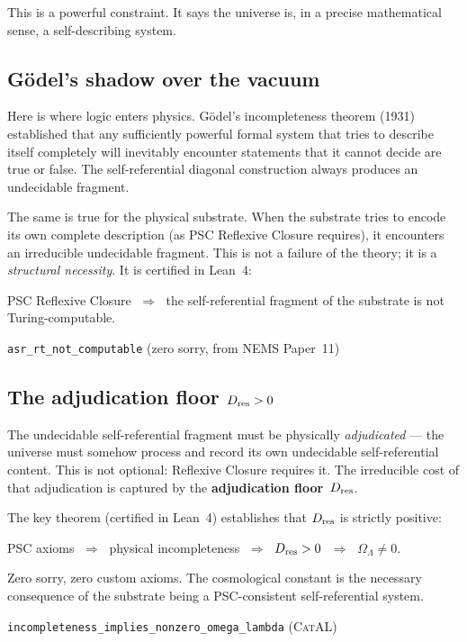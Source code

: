 \documentclass[11pt,a4paper]{article}
\newcommand{\term}[1]{\textbf{#1}}
\newcommand{\lean}[1]{\texttt{#1}}
\newcommand{\OmL}{\Omega_\Lambda}
\newcommand{\Dres}{D_{\rm res}}
\newcommand{\CatAL}{\textsc{CatAL}}
\begin{document}
This is a powerful constraint.  It says the universe is, in a precise
mathematical sense, a self-describing system.

\subsection{G\"{o}del's shadow over the vacuum}

Here is where logic enters physics.  G\"{o}del's incompleteness theorem (1931)
established that any sufficiently powerful formal system that tries to describe
itself completely will inevitably encounter statements that it cannot decide
are true or false.  The self-referential diagonal construction always produces
an undecidable fragment.

The same is true for the physical substrate.  When the substrate tries to encode
its own complete description (as PSC Reflexive Closure requires), it encounters
an irreducible undecidable fragment.  This is not a failure of the theory; it is
a \emph{structural necessity}.  It is certified in Lean~4:

\begin{tcolorbox}[colback=boxorange,colframe=orange!60!black,
  title={Theorem: Physical Incompleteness (\CatAL)}]
PSC Reflexive Closure $\;\Rightarrow\;$ the self-referential fragment of the
substrate is not Turing-computable.

\smallskip
\hfill\lean{asr\_rt\_not\_computable} (zero sorry, from NEMS Paper~11)
\end{tcolorbox}

\subsection{The adjudication floor \texorpdfstring{$\Dres > 0$}{D\_res > 0}}

The undecidable self-referential fragment must be physically \emph{adjudicated}
--- the universe must somehow process and record its own undecidable self-referential
content.  This is not optional: Reflexive Closure requires it.  The irreducible
cost of that adjudication is captured by the \term{adjudication floor}~$\Dres$.

The key theorem (certified in Lean~4) establishes that $\Dres$ is strictly
positive:

\begin{tcolorbox}[colback=boxorange,colframe=orange!60!black,
  title={Theorem: The PSC-Adjudication Theorem (\CatAL)}]
PSC axioms
$\;\Rightarrow\;$ physical incompleteness
$\;\Rightarrow\;$ $\Dres > 0$
$\;\Rightarrow\;$ $\OmL \neq 0$.

\smallskip
Zero sorry, zero custom axioms.  The cosmological constant is the necessary
consequence of the substrate being a PSC-consistent self-referential system.

\smallskip
\hfill\lean{incompleteness\_implies\_nonzero\_omega\_lambda} (\CatAL)
\end{tcolorbox}
\end{document}
